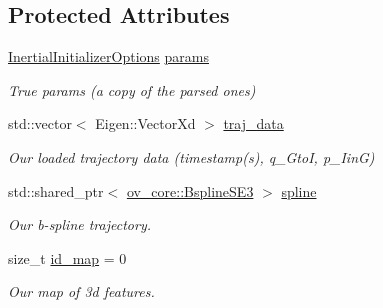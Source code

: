 \subsection*{Protected Attributes}
\begin{DoxyCompactItemize}
\item 
\mbox{\label{classov__init_1_1SimulatorInit_a372edd6c98642b8aabb583dbf11140f2}} 
\hyperlink{structov__init_1_1InertialInitializerOptions}{Inertial\+Initializer\+Options} \hyperlink{classov__init_1_1SimulatorInit_a372edd6c98642b8aabb583dbf11140f2}{params}
\begin{DoxyCompactList}\small\item\em True params (a copy of the parsed ones) \end{DoxyCompactList}\item 
\mbox{\label{classov__init_1_1SimulatorInit_abf0cb10b2d9ec0e5688071e40490ca01}} 
std\+::vector$<$ Eigen\+::\+Vector\+Xd $>$ \hyperlink{classov__init_1_1SimulatorInit_abf0cb10b2d9ec0e5688071e40490ca01}{traj\+\_\+data}
\begin{DoxyCompactList}\small\item\em Our loaded trajectory data (timestamp(s), q\+\_\+\+GtoI, p\+\_\+\+IinG) \end{DoxyCompactList}\item 
\mbox{\label{classov__init_1_1SimulatorInit_a40735548035cb62e36f9aac82921d8d3}} 
std\+::shared\+\_\+ptr$<$ \hyperlink{classov__core_1_1BsplineSE3}{ov\+\_\+core\+::\+Bspline\+S\+E3} $>$ \hyperlink{classov__init_1_1SimulatorInit_a40735548035cb62e36f9aac82921d8d3}{spline}
\begin{DoxyCompactList}\small\item\em Our b-\/spline trajectory. \end{DoxyCompactList}\item 
\mbox{\label{classov__init_1_1SimulatorInit_a2fb7a28d93c7b4d38d95bcaf13ecbef8}} 
size\+\_\+t \hyperlink{classov__init_1_1SimulatorInit_a2fb7a28d93c7b4d38d95bcaf13ecbef8}{id\+\_\+map} = 0
\begin{DoxyCompactList}\small\item\em Our map of 3d features. \end{DoxyCompactList}\item 

\end{DoxyCompactItemize}
